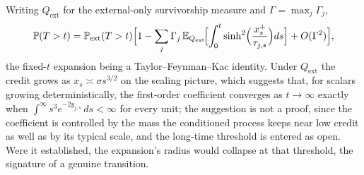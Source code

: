 \begin{proposition}\label{prop:perturb}
Writing $Q_{\mathrm{ext}}$ for the external-only survivorship measure and
$\Gamma=\max_j\Gamma_j$,
\begin{equation}\label{eq:perturb}
\mathbb{P}(T>t)=\mathbb{P}_{\mathrm{ext}}(T>t)\Bigl[1-\sum_j\Gamma_j\,
\mathbb{E}_{Q_{\mathrm{ext}}}\!\Bigl[\int_0^t\sinh^2\!\Big(\frac{x_s^+}{\tau_{j,s}}\Big)ds\Bigr]
+O(\Gamma^{2})\Bigr],
\end{equation}
the fixed-$t$ expansion being a Taylor--Feynman--Kac identity. Under
$Q_{\mathrm{ext}}$ the credit grows as $x_s\asymp\sigma s^{3/2}$ on the
scaling picture, which suggests that, for scalars growing
deterministically, the first-order coefficient converges as $t\to\infty$
exactly when $\int^\infty s^3e^{-2y_{j,s}}\,ds<\infty$ for every unit; the
suggestion is not a proof, since the coefficient is controlled by the mass
the conditioned process keeps near low credit as well as by its typical
scale, and the long-time threshold is entered as open. Were it
established, the expansion's radius would collapse at that threshold, the
signature of a genuine transition.
\end{proposition}
